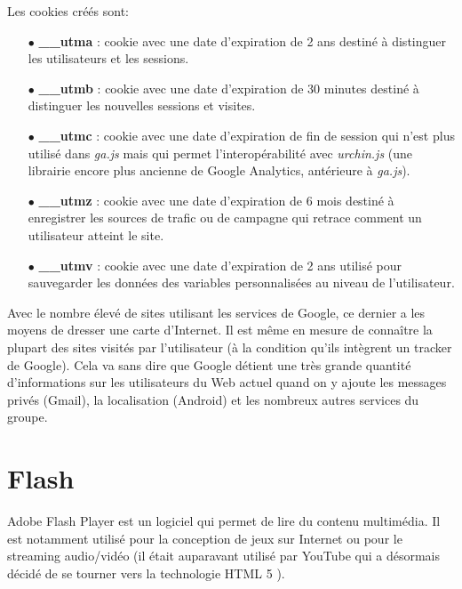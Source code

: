 Les cookies créés sont:
\begin{itemize}
  \item[$\bullet$] \textbf{\_\_utma} : cookie avec une date d'expiration de 2 ans destiné à distinguer les utilisateurs et les sessions.
  \item[$\bullet$] \textbf{\_\_utmb} : cookie avec une date d'expiration de 30 minutes destiné à distinguer les nouvelles sessions et visites.
  \item[$\bullet$] \textbf{\_\_utmc} : cookie avec une date d'expiration de fin de session qui n'est plus utilisé dans \textit{ga.js} mais qui permet l'interopérabilité avec \textit{urchin.js} (une librairie encore plus ancienne de Google Analytics, antérieure à \textit{ga.js}).
  \item[$\bullet$] \textbf{\_\_utmz} : cookie avec une date d'expiration de 6 mois destiné à enregistrer les sources de trafic ou de campagne qui retrace comment un utilisateur atteint le site.
  \item[$\bullet$] \textbf{\_\_utmv} : cookie avec une date d'expiration de 2 ans utilisé pour sauvegarder les données des variables personnalisées au niveau de l'utilisateur.
  \newline
\end{itemize}

Avec le nombre élevé de sites utilisant les services de Google, ce dernier a les moyens de dresser une carte d'Internet. Il est même en mesure de connaître la plupart des sites visités par l'utilisateur (à la condition qu'ils intègrent un tracker de Google). Cela va sans dire que Google détient une très grande quantité d'informations sur les utilisateurs du Web actuel quand on y ajoute les messages privés (Gmail), la localisation (Android) et les nombreux autres services du groupe.

\section{Flash}
\label{flash}
Adobe Flash Player \cite{flash_website} est un logiciel qui permet de lire du contenu multimédia. Il est notamment utilisé pour la conception de jeux sur Internet ou pour le streaming audio/vidéo (il était auparavant utilisé par YouTube qui a désormais décidé de se tourner vers la technologie HTML 5 \cite{youtube_html5}).
\newline

